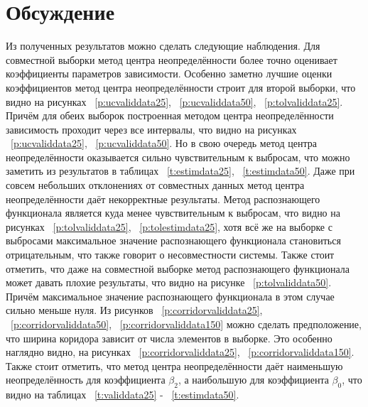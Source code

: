 \documentclass[a4paper,12pt]{article}
\begin{document}
    \section{Обсуждение}
    Из полученных результатов можно сделать следующие наблюдения.
    Для совместной выборки метод центра неопределённости более точно оценивает коэффициенты параметров зависимости.
    Особенно заметно лучшие оценки коэффициентов метод центра неопределённости строит для второй выборки, что видно на рисунках ~\ref{p:ucvaliddata25}, ~\ref{p:ucvaliddata50}, ~\ref{p:tolvaliddata25}.
    Причём для обеих выборок построенная методом центра неопределённости зависимость проходит через все интервалы, что видно на рисунках ~\ref{p:ucvaliddata25}, ~\ref{p:ucvaliddata50}.
    \newline
    Но в свою очередь метод центра неопределённости оказывается сильно чувствительным к выбросам, что можно заметить из результатов в таблицах ~\ref{t:estimdata25}, ~\ref{t:estimdata50}.
    Даже при совсем небольших отклонениях от совместных данных метод центра неопределённости даёт некорректные результаты.
    Метод распознающего функционала является куда менее чувствительным к выбросам, что видно на рисунках ~\ref{p:tolvaliddata25}, ~\ref{p:tolestimdata25},
    хотя всё же на выборке с выбросами максимальное значение распознающего функционала становиться отрицательным, что также говорит о несовместности системы.
    \newline
    Также стоит отметить, что даже на совместной выборке метод распознающего функционала может давать плохие результаты, что видно на рисунке ~\ref{p:tolvaliddata50}.
    Причём максимальное значение распознающего функционала в этом случае сильно меньше нуля.  
    \newline
    Из рисунков ~\ref{p:corridorvaliddata25}, ~\ref{p:corridorvaliddata50}, ~\ref{p:corridorvaliddata150} можно сделать предположение, что ширина коридора зависит от числа элементов в выборке.
    Это особенно наглядно видно, на рисунках ~\ref{p:corridorvaliddata25}, ~\ref{p:corridorvaliddata150}.
    \newline
    Также стоит отметить, что метод центра неопределённости даёт наименьшую неопределённость для коэффициента $ \beta_{2} $, а наибольшую для коэффициента $ \beta_{0} $, что видно на таблицах ~\ref{t:validdata25} - ~\ref{t:estimdata50}.
\end{document}
